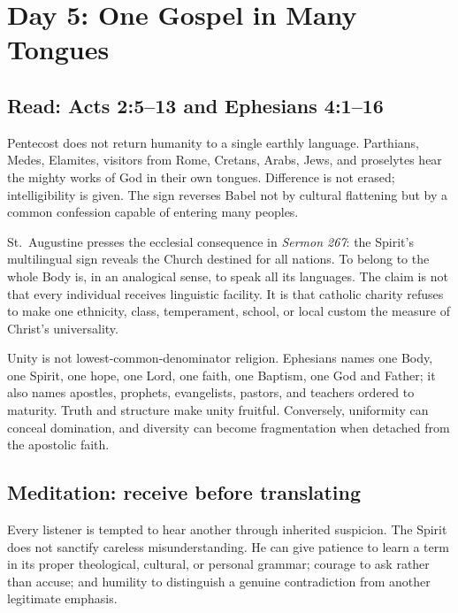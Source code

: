 \section{Day 5: One Gospel in Many Tongues}


\subsection{Read: Acts 2:5--13 and Ephesians 4:1--16}

Pentecost does not return humanity to a single earthly language. Parthians, Medes, Elamites, visitors from Rome, Cretans, Arabs, Jews, and proselytes hear the mighty works of God in their own tongues. Difference is not erased; intelligibility is given. The sign reverses Babel not by cultural flattening but by a common confession capable of entering many peoples.

St.~Augustine presses the ecclesial consequence in \textit{Sermon 267}: the Spirit's multilingual sign reveals the Church destined for all nations. To belong to the whole Body is, in an analogical sense, to speak all its languages. The claim is not that every individual receives linguistic facility. It is that catholic charity refuses to make one ethnicity, class, temperament, school, or local custom the measure of Christ's universality.

Unity is not lowest-common-denominator religion. Ephesians names one Body, one Spirit, one hope, one Lord, one faith, one Baptism, one God and Father; it also names apostles, prophets, evangelists, pastors, and teachers ordered to maturity. Truth and structure make unity fruitful. Conversely, uniformity can conceal domination, and diversity can become fragmentation when detached from the apostolic faith.

\subsection{Meditation: receive before translating}

Every listener is tempted to hear another through inherited suspicion. The Spirit does not sanctify careless misunderstanding. He can give patience to learn a term in its proper theological, cultural, or personal grammar; courage to ask rather than accuse; and humility to distinguish a genuine contradiction from another legitimate emphasis.

